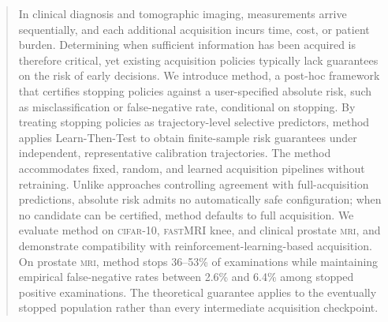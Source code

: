 \begin{abstract}
In clinical diagnosis and tomographic imaging, measurements arrive sequentially, and each additional acquisition incurs time, cost, or patient burden. Determining when sufficient information has been acquired is therefore critical, yet existing acquisition policies typically lack guarantees on the risk of early decisions. We introduce \gls{method}, a post-hoc framework that certifies stopping policies against a user-specified absolute risk, such as misclassification or false-negative rate, conditional on stopping. By treating stopping policies as trajectory-level selective predictors, \gls{method} applies Learn-Then-Test to obtain finite-sample risk guarantees under independent, representative calibration trajectories. The method accommodates fixed, random, and learned acquisition pipelines without retraining. Unlike approaches controlling agreement with full-acquisition predictions, absolute risk admits no automatically safe configuration; when no candidate can be certified, \gls{method} defaults to full acquisition. We evaluate \gls{method} on \textsc{cifar}-10, \textsc{fastMRI} knee, and clinical prostate \textsc{mri}, and demonstrate compatibility with reinforcement-learning-based acquisition. On prostate \textsc{mri}, \gls{method} stops 36--53\% of examinations while maintaining empirical false-negative rates between 2.6\% and 6.4\% among stopped positive examinations. The theoretical guarantee applies to the eventually stopped population rather than every intermediate acquisition checkpoint.
\end{abstract}
